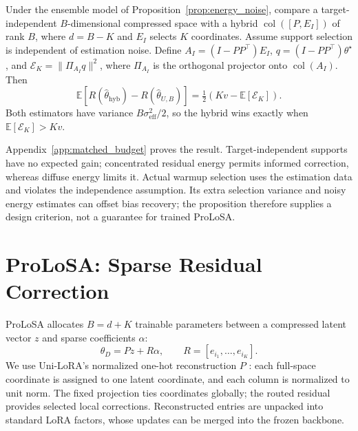 \begin{proposition}
\label{prop:matched_budget}
Under the ensemble model of Proposition~\ref{prop:energy_noise}, compare a target-independent $B$-dimensional compressed space with a hybrid $\operatorname{col}([P,E_I])$ of rank $B$, where $d=B-K$ and $E_I$ selects $K$ coordinates. Assume support selection is independent of estimation noise. Define $A_I=(I-PP^\top)E_I$, $q=(I-PP^\top)\theta^\star$, and $\mathcal E_K=\|\Pi_{A_I}q\|^2$, where $\Pi_{A_I}$ is the orthogonal projector onto $\operatorname{col}(A_I)$. Then
\begin{equation}
 \mathbb E[R(\hat\theta_{\mathrm{hyb}})-R(\hat\theta_{U,B})]
 =\tfrac12(Kv-\mathbb E[\mathcal E_K]).
 \label{main:matched}
\end{equation}
Both estimators have variance $B\sigma_{\mathrm{eff}}^2/2$, so the hybrid wins exactly when $\mathbb E[\mathcal E_K]>Kv$.
\end{proposition}
Appendix~\ref{app:matched_budget} proves the result. Target-independent supports have no expected gain; concentrated residual energy permits informed correction, whereas diffuse energy limits it. Actual warmup selection uses the estimation data and violates the independence assumption. Its extra selection variance and noisy energy estimates can offset bias recovery; the proposition therefore supplies a design criterion, not a guarantee for trained ProLoSA.

\section{ProLoSA: Sparse Residual Correction}
\label{main:method}
ProLoSA allocates $B=d+K$ trainable parameters between a compressed latent vector $z$ and sparse coefficients $\alpha$:
\begin{equation}
 \theta_D=Pz+R\alpha,\qquad R=[e_{i_1},\ldots,e_{i_K}].
 \label{main:method_eq}
\end{equation}
We use Uni-LoRA's normalized one-hot reconstruction $P$ \citep{li2025unilora}: each full-space coordinate is assigned to one latent coordinate, and each column is normalized to unit norm. The fixed projection ties coordinates globally; the routed residual provides selected local corrections. Reconstructed entries are unpacked into standard LoRA factors, whose updates can be merged into the frozen backbone.

